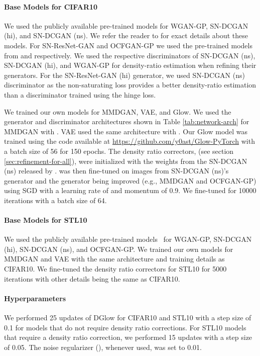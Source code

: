 \documentclass{article} \usepackage{iclr2021_conference,times}
\newcommand{\ourmethod}{\textsc{DG}low}
\begin{document}
\paragraph{Base Models for CIFAR10} We used the publicly available pre-trained models for WGAN-GP, SN-DCGAN (hi), and SN-DCGAN (ns). We refer the reader to \citet{tanaka2019discriminator} for exact details about these models. For SN-ResNet-GAN and OCFGAN-GP we used the pre-trained models from \citet{miyato2018spectral} and \citet{ansari2020characteristic} respectively. We used the respective discriminators of SN-DCGAN (ns), SN-DCGAN (hi), and WGAN-GP for density-ratio estimation when refining their generators. For the SN-ResNet-GAN (hi) generator, we used SN-DCGAN (ns) discriminator as the non-saturating loss provides a better density-ratio estimation than a discriminator trained using the hinge loss.

We trained our own models for MMDGAN, VAE, and Glow. We used the generator and discriminator architectures shown in Table \ref{tab:network-arch} for MMDGAN with . VAE used the same architecture with . Our Glow model was trained using the code available at \url{https://github.com/y0ast/Glow-PyTorch} with a batch size of 56 for 150 epochs. The density ratio correctors,  (see section \ref{sec:refinement-for-all}), were initialized with the weights from the SN-DCGAN (ns) released by \citet{tanaka2019discriminator}.  was then fine-tuned on images from SN-DCGAN (ns)'s generator and the generator being improved (e.g., MMDGAN and OCFGAN-GP) using SGD with a learning rate of  and momentum of 0.9.  We fine-tuned  for 10000 iterations with a batch size of 64.

\paragraph{Base Models for STL10} We used the publicly available pre-trained models~\citep{tanaka2019discriminator,ansari2020characteristic} for WGAN-GP, SN-DCGAN (hi), SN-DCGAN (ns), and OCFGAN-GP. We trained our own models for MMDGAN and VAE with the same architecture and training details as CIFAR10. We fine-tuned the density ratio correctors for STL10 for 5000 iterations with other details being the same as CIFAR10.

\paragraph{Hyperparameters} We performed 25 updates of \ourmethod{} for CIFAR10 and STL10 with a step size of 0.1 for models that do not require density ratio corrections. For STL10 models that require a density ratio correction, we performed 15 updates with a step size of 0.05. The noise regularizer (), whenever used, was set to 0.01.
\end{document}
